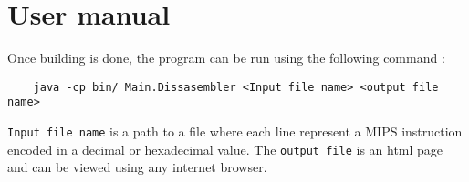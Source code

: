 \section{User manual}

Once building is done, the program can be run using the following command :
\begin{verbatim}
	java -cp bin/ Main.Dissasembler <Input file name> <output file name>
\end{verbatim} 
\verb?Input file name? is a path to a file where each line represent a MIPS instruction encoded in a decimal or hexadecimal value. The \verb?output file? is an html page and can be viewed using any internet browser. 